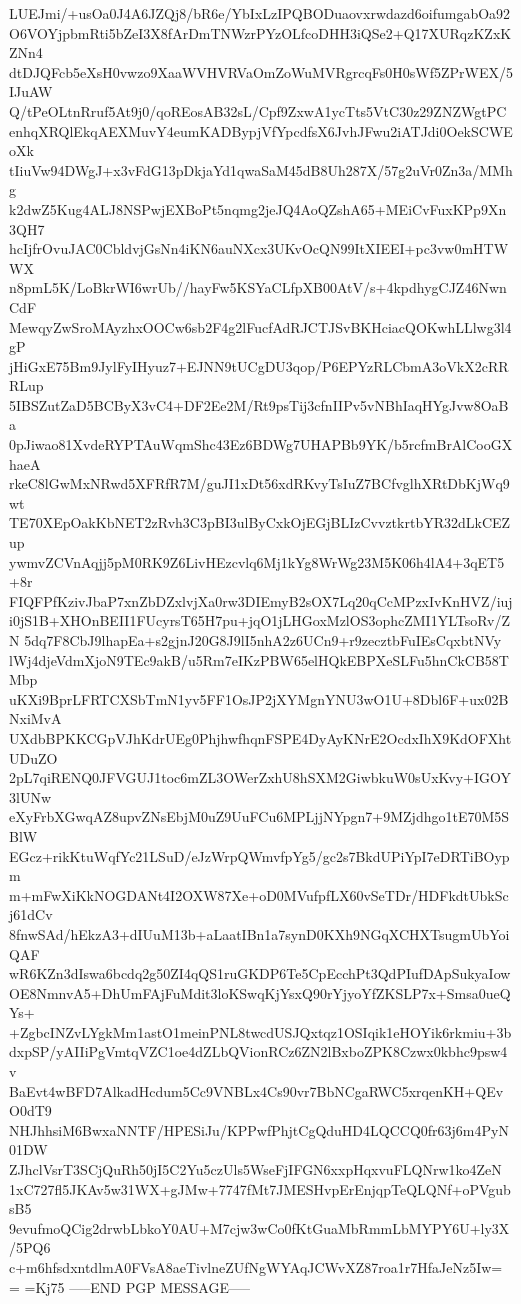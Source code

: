 LUEJmi/+usOa0J4A6JZQj8/bR6e/YbIxLzIPQBODuaovxrwdazd6oifumgabOa92
O6VOYjpbmRti5bZeI3X8fArDmTNWzrPYzOLfcoDHH3iQSe2+Q17XURqzKZxKZNn4
dtDJQFcb5eXsH0vwzo9XaaWVHVRVaOmZoWuMVRgrcqFs0H0sWf5ZPrWEX/5IJuAW
Q/tPeOLtnRruf5At9j0/qoREosAB32sL/Cpf9ZxwA1ycTts5VtC30z29ZNZWgtPC
enhqXRQlEkqAEXMuvY4eumKADBypjVfYpcdfsX6JvhJFwu2iATJdi0OekSCWEoXk
tIiuVw94DWgJ+x3vFdG13pDkjaYd1qwaSaM45dB8Uh287X/57g2uVr0Zn3a/MMhg
k2dwZ5Kug4ALJ8NSPwjEXBoPt5nqmg2jeJQ4AoQZshA65+MEiCvFuxKPp9Xn3QH7
hcIjfrOvuJAC0CbldvjGsNn4iKN6auNXcx3UKvOcQN99ItXIEEI+pc3vw0mHTWWX
n8pmL5K/LoBkrWI6wrUb//hayFw5KSYaCLfpXB00AtV/s+4kpdhygCJZ46NwnCdF
MewqyZwSroMAyzhxOOCw6sb2F4g2lFucfAdRJCTJSvBKHciacQOKwhLLlwg3l4gP
jHiGxE75Bm9JylFyIHyuz7+EJNN9tUCgDU3qop/P6EPYzRLCbmA3oVkX2cRRRLup
5IBSZutZaD5BCByX3vC4+DF2Ee2M/Rt9psTij3cfnIIPv5vNBhIaqHYgJvw8OaBa
0pJiwao81XvdeRYPTAuWqmShc43Ez6BDWg7UHAPBb9YK/b5rcfmBrAlCooGXhaeA
rkeC8lGwMxNRwd5XFRfR7M/guJI1xDt56xdRKvyTsIuZ7BCfvglhXRtDbKjWq9wt
TE70XEpOakKbNET2zRvh3C3pBI3ulByCxkOjEGjBLIzCvvztkrtbYR32dLkCEZup
ywmvZCVnAqjj5pM0RK9Z6LivHEzcvlq6Mj1kYg8WrWg23M5K06h4lA4+3qET5+8r
FIQFPfKzivJbaP7xnZbDZxlvjXa0rw3DIEmyB2sOX7Lq20qCcMPzxIvKnHVZ/iuj
i0jS1B+XHOnBEII1FUcyrsT65H7pu+jqO1jLHGoxMzlOS3ophcZMI1YLTsoRv/ZN
5dq7F8CbJ9lhapEa+s2gjnJ20G8J9lI5nhA2z6UCn9+r9zecztbFuIEsCqxbtNVy
lWj4djeVdmXjoN9TEc9akB/u5Rm7eIKzPBW65elHQkEBPXeSLFu5hnCkCB58TMbp
uKXi9BprLFRTCXSbTmN1yv5FF1OsJP2jXYMgnYNU3wO1U+8Dbl6F+ux02BNxiMvA
UXdbBPKKCGpVJhKdrUEg0PhjhwfhqnFSPE4DyAyKNrE2OcdxIhX9KdOFXhtUDuZO
2pL7qiRENQ0JFVGUJ1toc6mZL3OWerZxhU8hSXM2GiwbkuW0sUxKvy+IGOY3lUNw
eXyFrbXGwqAZ8upvZNsEbjM0uZ9UuFCu6MPLjjNYpgn7+9MZjdhgo1tE70M5SBlW
EGcz+rikKtuWqfYc21LSuD/eJzWrpQWmvfpYg5/gc2s7BkdUPiYpI7eDRTiBOypm
m+mFwXiKkNOGDANt4I2OXW87Xe+oD0MVufpfLX60vSeTDr/HDFkdtUbkScj61dCv
8fnwSAd/hEkzA3+dIUuM13b+aLaatIBn1a7synD0KXh9NGqXCHXTsugmUbYoiQAF
wR6KZn3dIswa6bcdq2g50ZI4qQS1ruGKDP6Te5CpEcchPt3QdPIufDApSukyaIow
OE8NmnvA5+DhUmFAjFuMdit3loKSwqKjYsxQ90rYjyoYfZKSLP7x+Smsa0ueQYs+
+ZgbcINZvLYgkMm1astO1meinPNL8twcdUSJQxtqz1OSIqik1eHOYik6rkmiu+3b
dxpSP/yAIIiPgVmtqVZC1oe4dZLbQVionRCz6ZN2lBxboZPK8Czwx0kbhc9psw4v
BaEvt4wBFD7AlkadHcdum5Cc9VNBLx4Cs90vr7BbNCgaRWC5xrqenKH+QEvO0dT9
NHJhhsiM6BwxaNNTF/HPESiJu/KPPwfPhjtCgQduHD4LQCCQ0fr63j6m4PyN01DW
ZJhclVsrT3SCjQuRh50jI5C2Yu5czUls5WseFjIFGN6xxpHqxvuFLQNrw1ko4ZeN
1xC727fl5JKAv5w31WX+gJMw+7747fMt7JMESHvpErEnjqpTeQLQNf+oPVgubsB5
9evufmoQCig2drwbLbkoY0AU+M7cjw3wCo0fKtGuaMbRmmLbMYPY6U+ly3X/5PQ6
c+m6hfsdxntdlmA0FVsA8aeTivlneZUfNgWYAqJCWvXZ87roa1r7HfaJeNz5Iw==
=Kj75
-----END PGP MESSAGE-----
